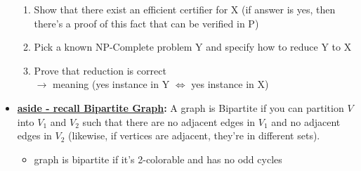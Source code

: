 \begin{itemize}
    \begin{enumerate}
        \item Show that there exist an efficient certifier for X (if answer is yes, then there's a proof of this fact that can be verified in P)
        \item Pick a known NP-Complete problem Y and specify how to reduce Y to X 
        \item Prove that reduction is correct \\
        $\longrightarrow$ meaning (yes instance in Y $\Longleftrightarrow$ yes instance in X)
    \end{enumerate}
    \item \textbf{\ul{aside - recall Bipartite Graph}:} A graph is Bipartite if you can partition $V$ into $V_1$ and $V_2$ such that there are no adjacent edges in $V_1$ and no adjacent edges in $V_2$ (likewise, if vertices are adjacent, they're in different sets). 
    \begin{itemize}[leftmargin = 1em]
        \item graph is bipartite if it's 2-colorable and has no odd cycles
    \end{itemize}
\end{itemize}
